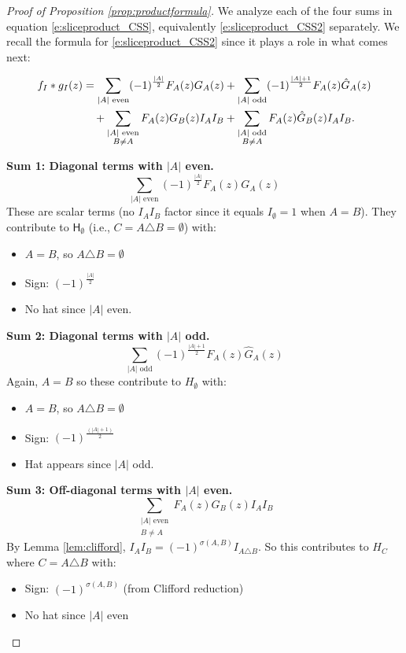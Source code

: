 \documentclass[11pt]{amsart}
\begin{document}
\begin{proof}[Proof of Proposition \ref{prop:productformula}]
We analyze each of the four sums in equation \eqref{e:sliceproduct_CSS}, equivalently \eqref{e:sliceproduct_CSS2} separately.  We recall the formula for \eqref{e:sliceproduct_CSS2} since it plays a role in what comes next:

\begin{align*}
f_I * g_I(z) &= \sum_{|A| \text{ even}} (-1)^{\frac{|A|}{2}} F_A(z) G_A(z) + \sum_{|A| \text{ odd}} (-1)^{\frac{|A|+1}{2}} F_A(z) \hat{G}_A(z) \notag \\
&\quad + \sum_{\substack{|A| \text{ even} \\ B \neq A}} F_A(z) G_B(z) I_A I_B + \sum_{\substack{|A| \text{ odd} \\ B \neq A}} F_A(z) \hat{G}_B(z) I_A I_B. \notag%
\end{align*}

\textbf{Sum 1: Diagonal terms with $|A|$ even.}
\[
\sum_{|A| \text{ even}} (-1)^{\frac{|A|}{2}} F_A(z) G_A(z)
\]
These are scalar terms (no $I_A I_B$ factor since it equals $I_\emptyset = 1$ when $A = B$). They contribute to $\mathsf{H}_\emptyset$ (i.e., $C=A\triangle B = \emptyset$) with:
\begin{itemize}
    \item $A = B$, so $A \triangle B = \emptyset$
    \item Sign: $(-1)^{\frac{|A|}{2}}$
    \item No hat since $|A|$ even.
\end{itemize}

\textbf{Sum 2: Diagonal terms with $|A|$ odd.}
\[
\sum_{|A| \text{ odd}} (-1)^{\frac{|A|+1}{2}} F_A(z) \hat{G}_A(z)
\]
Again, $A = B$ so these contribute to $H_\emptyset$ with:
\begin{itemize}
    \item $A = B$, so $A \triangle B = \emptyset$
    \item Sign: $(-1)^{\frac{(|A|+1)}{2}}$
    \item Hat appears since $|A|$ odd.
\end{itemize}

\textbf{Sum 3: Off-diagonal terms with $|A|$ even.}
\[
\sum_{\substack{|A| \text{ even} \\ B \neq A}} F_A(z) G_B(z) I_A I_B
\]
By Lemma \ref{lem:clifford}, $I_A I_B = (-1)^{\sigma(A,B)} I_{A \triangle B}$.  So this contributes to $H_C$ where $C = A \triangle B$ with:
\begin{itemize}
    \item Sign: $(-1)^{\sigma(A,B)}$ (from Clifford reduction)
    \item No hat since $|A|$ even
\end{itemize}


\end{proof}
\end{document}
